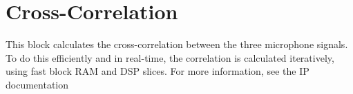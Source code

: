 \section{Cross-Correlation}
\label{sec::xcorr}

This block calculates the cross-correlation between the three microphone signals.
To do this efficiently and in real-time, the correlation is calculated iteratively, using fast block RAM and DSP slices.
For more information, see the IP documentation